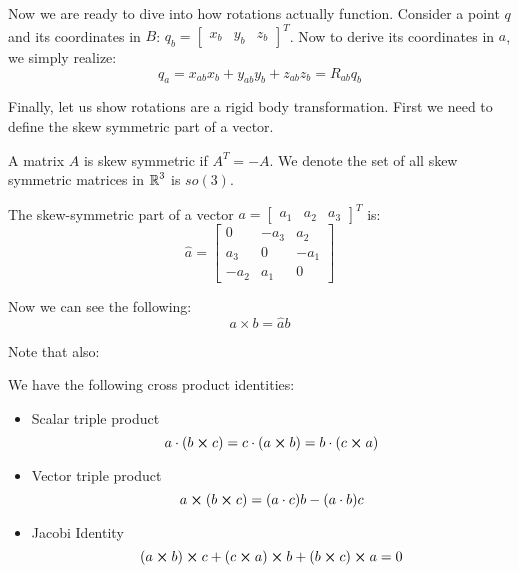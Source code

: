 Now we are ready to dive into how rotations actually function. Consider a point $q$ and its coordinates in $B$:
$q_b = \begin{bmatrix}
    x_b & y_b & z_b
\end{bmatrix}^T$. Now to derive its coordinates in $a$, we simply realize:
\[ q_a = x_{ab} x_b + y_{ab} y_b + z_{ab} z_b = R_{ab} q_b \]

Finally, let us show rotations are a rigid body transformation. First we need to
define the skew symmetric part of a vector.

\begin{definition}
    A matrix $A$ is skew symmetric if $A^T = - A$. We denote the set of all skew symmetric matrices in $\operatorname{\mathbb{R}}^3$ is
    $so(3)$.
\end{definition}

\begin{definition}
    The skew-symmetric part of a vector $a = \begin{bmatrix}
        a_1 & a_2 & a_3
    \end{bmatrix}^T$ is:
    \[ \hat{a} = \begin{bmatrix}
        0 & -a_3  & a_2 \\
        a_3 & 0 & -a_1 \\
        -a_2 & a_1 & 0
    \end{bmatrix} \]
\end{definition}

Now we can see the following:
\[ a \times b = \hat{a} b \]

Note that also:
\begin{theorem}
    We have the following cross product identities:
    \begin{itemize}
        \item Scalar triple product
        \[ a \cdot (b \cross c) = c \cdot (a \cross b) = b \cdot (c \cross a) \]
        \item Vector triple product
        \[ a \cross (b \cross c) = (a \cdot c) b - (a \cdot b) c \]
        \item Jacobi Identity
        \[ (a \cross b) \cross c + (c \cross a) \cross b + (b \cross c) \cross a = 0 \]
    \end{itemize}
\end{theorem}

